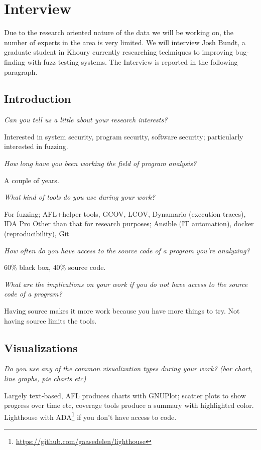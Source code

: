 \documentclass{article}
\begin{document}
\section{Interview}

Due to the research oriented nature of the data we will be working on, the number of experts in the area is very limited. We will interview Josh Bundt, a graduate student in Khoury currently researching techniques to improving bug-finding with fuzz testing systems. The Interview is reported in the following paragraph.


\subsection{Introduction}

\textit{Can you tell us a little about your research interests?}

Interested in system security, program security, software security; particularly interested in fuzzing.

\textit{How long have you been working the field of program analysis?}

A couple of years.

\textit{What kind of tools do you use during your work? }

For fuzzing; AFL+helper tools, GCOV, LCOV, Dynamario (execution traces),  IDA Pro
Other than that for research purposes; Ansible (IT automation), docker (reproducibility), Git

\textit{How often do you have access to the source code of a program you’re analyzing?}

$60\%$ black box, $40\%$ source code.

\textit{What are the implications on your work if you do not have access to the source code of a program?}

Having source makes it more work because you have more things to try. 
Not having source limits the tools. 

\subsection{Visualizations}

\textit{Do you use any of the common visualization types during your work? (bar chart, line graphs, pie charts etc)}

Largely text-based, AFL produces charts with GNUPlot; scatter plots to show progress over time etc, coverage tools produce a summary with highlighted color. Lighthouse with ADA\footnote{\url{https://github.com/gaasedelen/lighthouse}} if you don’t have access to code.
\end{document}
